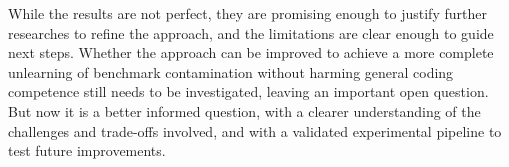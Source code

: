 \documentclass[mscthesis]{usiinfthesis}
\begin{document}
While the results are not perfect, they are promising enough to justify further researches to refine the approach, and the limitations are clear enough to guide next steps.
Whether the approach can be improved to achieve a more complete unlearning of benchmark contamination without harming general coding competence still needs to be investigated, leaving an important open question.
But now it is a better informed question, with a clearer understanding of the challenges and trade-offs involved, and with a validated experimental pipeline to test future improvements.






\backmatter


%
%



\end{document}
